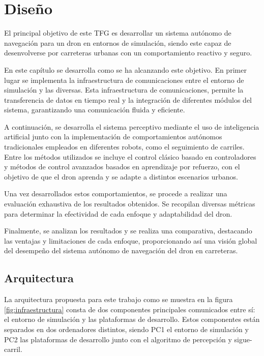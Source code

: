 \chapter{Diseño}
\label{cap:capitulo4}


\vspace{1cm}
El principal objetivo de este TFG es desarrollar un sistema autónomo de navegación para un dron en entornos de simulación, siendo este capaz de desenvolverse
por carreteras urbanas con un comportamiento reactivo y seguro. 

En este capítulo se desarrolla como se ha alcanzando este objetivo. En primer lugar se implementa la infraestructura de comunicaciones entre el entorno de simulación y las diversas. Esta 
infraestructura de comunicaciones, permite la transferencia de datos en tiempo real y la integración de diferentes módulos del sistema, garantizando 
una comunicación fluida y eficiente.

A continuación, se desarrolla el sistema perceptivo mediante el uso de inteligencia artificial junto con la implementación de comportamientos autónomos tradicionales empleados
 en diferentes robots, como el seguimiento de carriles. Entre los métodos utilizados se incluye 
el control clásico basado en controladores y métodos de control avanzados basados en aprendizaje por refuerzo, con el objetivo de que el dron aprenda y se 
adapte a distintos escenarios urbanos. 

Una vez desarrollados estos comportamientos, se procede a realizar una evaluación exhaustiva de los resultados obtenidos. Se recopilan
diversas métricas para determinar la efectividad de cada enfoque y adaptabilidad del dron. 

Finalmente, se analizan los resultados y se realiza una comparativa, destacando las ventajas y limitaciones de cada enfoque, 
proporcionando así una visión global del desempeño del sistema autónomo 
de navegación del dron en carreteras.\newline

\section{Arquitectura}
\label{sec:Arquitectura}

La arquitectura propuesta para este trabajo como se muestra en la figura \ref{fig:infraestructura} consta de dos componentes principales 
comunicados entre sí: el entorno de simulación  y las plataformas de desarrollo. Estos componentes 
están separados en dos ordenadores distintos, siendo PC1 el entorno de simulación y PC2 las plataformas de desarrollo junto con el algoritmo de percepción y sigue-carril. 

